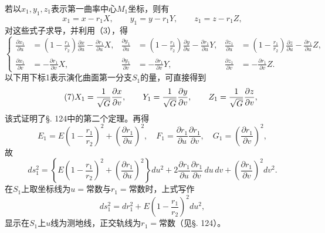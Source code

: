 若以\(x_1,y_1,z_1\)表示第一曲率中心\(M_1\)坐标，则有
\begin{equation}\tag{5}
 x_1=x-r_1X,
 \qquad y_1=y-r_1Y,
 \qquad z_1=z-r_1Z,
\end{equation}
对这些式子求导，并利用（3），得
\begin{equation}\tag{6}
\left\{
\begin{aligned}
\frac{\partial x_1}{\partial u}&=\left(1-\frac{r_1}{r_2}\right)\frac{\partial x}{\partial u}-\frac{\partial r_1}{\partial u}X,&
\frac{\partial y_1}{\partial u}&=\left(1-\frac{r_1}{r_2}\right)\frac{\partial y}{\partial u}-\frac{\partial r_1}{\partial u}Y,&
\frac{\partial z_1}{\partial u}&=\left(1-\frac{r_1}{r_2}\right)\frac{\partial z}{\partial u}-\frac{\partial r_1}{\partial u}Z,\\
\frac{\partial x_1}{\partial v}&=-\frac{\partial r_1}{\partial v}X,&
\frac{\partial y_1}{\partial v}&=-\frac{\partial r_1}{\partial v}Y,&
\frac{\partial z_1}{\partial v}&=-\frac{\partial r_1}{\partial v}Z.
\end{aligned}
\right.
\end{equation}
以下用下标1表示演化曲面第一分支\(S_1\)的量，可直接得到
\begin{equation}\tag{7}
 X_1=\frac1{\sqrt G}\frac{\partial x}{\partial v},
 \qquad Y_1=\frac1{\sqrt G}\frac{\partial y}{\partial v},
\qquad Z_1=\frac1{\sqrt G}\frac{\partial z}{\partial v},
\end{equation}
该式证明了\S. 124中的第二个定理。再得
\begin{equation}\tag{8}
 E_1=E\left(1-\frac{r_1}{r_2}\right)^2+\left(\frac{\partial r_1}{\partial u}\right)^2,
 \quad F_1=\frac{\partial r_1}{\partial u}\frac{\partial r_1}{\partial v},
 \quad G_1=\left(\frac{\partial r_1}{\partial v}\right)^2,
\end{equation}
故
\begin{equation}\tag{9}
 ds_1^2=\left\{E\left(1-\frac{r_1}{r_2}\right)^2+\left(\frac{\partial r_1}{\partial u}\right)^2\right\}du^2+2\frac{\partial r_1}{\partial u}\frac{\partial r_1}{\partial v}\,du\,dv+\left(\frac{\partial r_1}{\partial v}\right)^2dv^2.
\end{equation}
在\(S_1\)上取坐标线为\(u=\)常数与\(r_1=\)常数时，上式写作
\begin{equation}\tag{9*}
 ds_1^2=dr_1^2+E\left(1-\frac{r_1}{r_2}\right)^2du^2,
\end{equation}
显示在\(S_1\)上\(u\)线为测地线，正交轨线为\(r_1=\)常数（见\S. 124）。

